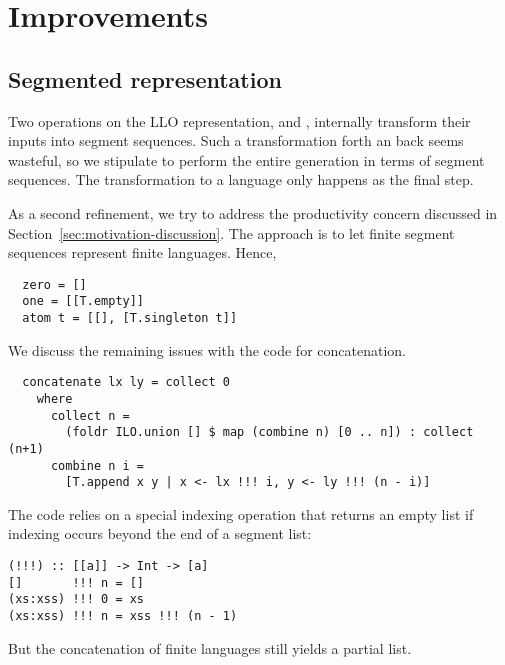 \section{Improvements}
\label{sec:improvements}

\subsection{Segmented representation}
\label{sec:segm-repr}

Two operations on the LLO representation,  and
, internally transform their inputs into segment
sequences. Such a transformation forth an back seems wasteful, so we
stipulate to perform the entire generation in terms of segment
sequences. The transformation to a language only happens as the final
step.

As a second refinement, we try to address the productivity concern
discussed in Section~\ref{sec:motivation-discussion}. The approach is
to let finite segment sequences represent finite languages. Hence,
\begin{lstlisting}
  zero = []
  one = [[T.empty]]
  atom t = [[], [T.singleton t]]
\end{lstlisting}

We discuss the remaining issues with the code for concatenation.
\begin{lstlisting}
  concatenate lx ly = collect 0
    where
      collect n =
        (foldr ILO.union [] $ map (combine n) [0 .. n]) : collect (n+1)
      combine n i =
        [T.append x y | x <- lx !!! i, y <- ly !!! (n - i)]
\end{lstlisting}
The code relies on a special indexing operation that returns an empty
list if indexing occurs beyond the end of a segment list:
\begin{lstlisting}
(!!!) :: [[a]] -> Int -> [a]
[]       !!! n = []
(xs:xss) !!! 0 = xs
(xs:xss) !!! n = xss !!! (n - 1)
\end{lstlisting}
But the concatenation of finite languages still yields a partial list.

\clearpage{}
